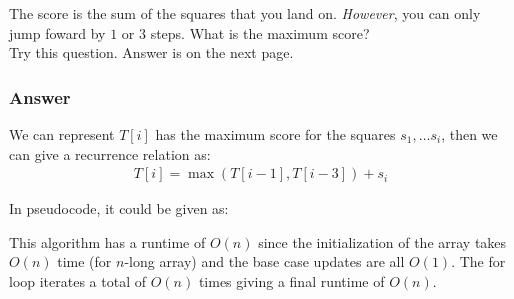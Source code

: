 \documentclass[14pt]{extarticle}
\begin{document}
    The score is the sum of the squares that you land on. \textit{However}, you
    can only jump foward by $1$ or $3$ steps. What is the maximum score?\\

    Try this question. Answer is on the next page.
    
    \pagebreak

    \subsubsection*{Answer}
    We can represent $T[i]$ has the maximum score for the squares $s_1, \ldots
    s_i$, then we can give a recurrence relation as:
    \begin{align*}
        T[i] = \max(T[i-1], T[i-3]) + s_i
    \end{align*}
    
    In pseudocode, it could be given as:

    \begin{algorithm}[H]
    \end{algorithm}

    This algorithm has a runtime of $O(n)$ since the initialization of
    the array takes $O(n)$ time (for $n$-long array) and the base case updates
    are all $O(1)$. The for loop iterates a total of $O(n)$ times giving
    a final runtime of $O(n)$.
\end{document}
